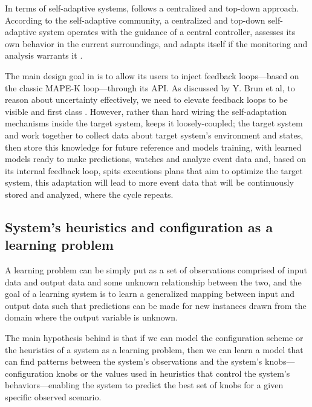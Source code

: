 In terms of self-adaptive systems, \projectname{} follows a centralized and top-down approach. According to the self-adaptive community, a centralized and top-down self-adaptive system operates with the guidance of a central controller, assesses its own behavior in the current surroundings, and adapts itself if the monitoring and analysis warrants it \cite{brun_engineering_2009}.

The main design goal in \projectname{} is to allow its users to inject feedback loops---based on the classic MAPE-K loop---through its API. As discussed by Y. Brun et al, to reason about uncertainty effectively, we need to elevate feedback loops to be visible and first class \cite{brun_engineering_2009}. However, rather than hard wiring the self-adaptation mechanisms inside the target system, \projectname{} keeps it loosely-coupled; the target system and \projectname{} work together to collect data about target system's environment and states, then \projectname{} store this knowledge for future reference and models training, with learned models ready to make predictions, \projectname{} watches and analyze event data and, based on its internal feedback loop, spits executions plans that aim to optimize the target system, this adaptation will lead to more event data that will be continuously stored and analyzed, where the cycle repeats.



\subsection{System's heuristics and configuration as a learning problem}

A learning problem can be simply put as a set of observations comprised of input data and output data and some unknown relationship between the two, and the goal of a learning system is to learn a generalized mapping between input and output data such that predictions can be made for new instances drawn from the domain where the output variable is unknown.

The main hypothesis behind \projectname{} is that if we can model the configuration scheme or the heuristics of a system as a learning problem, then we can learn a model that can find patterns between the system's observations and the system's knobs---configuration knobs or the values used in heuristics that control the system's behaviors---enabling the system to predict the best set of knobs for a given specific observed scenario.

